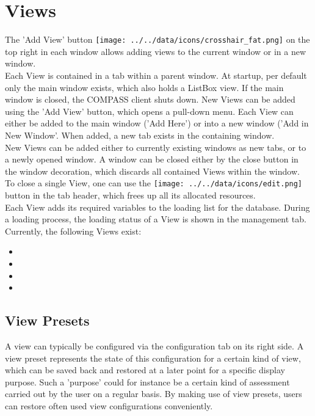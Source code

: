 \section{Views}
The 'Add View' button \texttt{[image: ../../data/icons/crosshair\_fat.png]} on the top right in each window allows adding views to the current window or in a new window. \\

Each View is contained in a tab within a parent window.  At startup, per default only the main window exists, which also holds
a ListBox view. If the main window is closed, the COMPASS client shuts down. New Views can be added using the 'Add View' button, which opens a pull-down menu. Each View can either be added to the main window ('Add Here') or into a new window ('Add in New Window'. When added, a new tab exists in the containing window. \\

New Views can be added either to currently existing windows as new tabs, or to a newly opened window. A window can be closed either by the close button in the window decoration, which discards all contained Views within the window.  \\

To close a single View, one can use the \texttt{[image: ../../data/icons/edit.png]} button in the tab header, which frees up all its allocated resources. \\

Each View adds its required variables to the loading list for the database. During a loading process, the loading status  of a View is shown in the management tab.\\

Currently, the following Views exist:
\begin{itemize}
 \item {}
 \item {}
 \item {}
 \item {}
\end{itemize}

\subsection{View Presets}

A view can typically be configured via the configuration tab on its right side.
A view preset represents the state of this configuration for a certain kind of view,
which can be saved back and restored at a later point for a specific display purpose. 
Such a 'purpose' could for instance be a certain kind of assessment carried out by the user
on a regular basis. By making use of view presets, users can restore often used view configurations conveniently. \\

